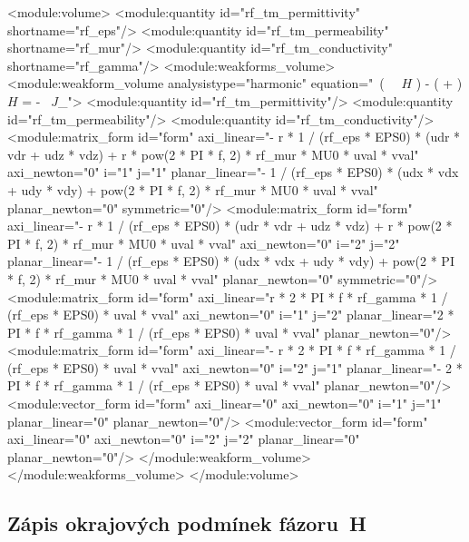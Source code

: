 \documentclass[12pt,a4paper,oneside]{article}
\numberwithin{equation}{section} %
\numberwithin{figure}{section} %
\numberwithin{table}{section} %
\newcommand{\mj}{\mathrm{j}} %
\newcommand{\vecfaz}[1]{\mbox{\underline{\boldmath$#1$}}} %
\newcommand{\curl}{\mathrm{curl}\ }
\begin{document}
\small\begin{spverbatim}
  <module:volume>
    <module:quantity id="rf_tm_permittivity" shortname="rf_eps"/>
    <module:quantity id="rf_tm_permeability" shortname="rf_mur"/>
    <module:quantity id="rf_tm_conductivity" shortname="rf_gamma"/>
    <module:weakforms_volume>
      <module:weakform_volume analysistype="harmonic" equation="\curl \left( \, \curl \vecfaz{H} \right) - \mj \omega \left( \gamma + \mj \omega \varepsilon \right) \vecfaz{H} = - \curl \vecfaz{J}_{}">
        <module:quantity id="rf_tm_permittivity"/>
        <module:quantity id="rf_tm_permeability"/>
        <module:quantity id="rf_tm_conductivity"/>
        <module:matrix_form id="form" axi_linear="- r * 1 / (rf_eps * EPS0) * (udr * vdr + udz * vdz) + r * pow(2 * PI * f, 2) * rf_mur * MU0 * uval * vval" axi_newton="0" i="1" j="1" planar_linear="- 1 / (rf_eps * EPS0) * (udx * vdx + udy * vdy) + pow(2 * PI * f, 2) * rf_mur * MU0 * uval * vval" planar_newton="0" symmetric="0"/>
        <module:matrix_form id="form" axi_linear="- r * 1 / (rf_eps * EPS0) * (udr * vdr + udz * vdz) + r * pow(2 * PI * f, 2) * rf_mur * MU0 * uval * vval" axi_newton="0" i="2" j="2" planar_linear="- 1 / (rf_eps * EPS0) * (udx * vdx + udy * vdy) + pow(2 * PI * f, 2) * rf_mur * MU0 * uval * vval" planar_newton="0" symmetric="0"/>
        <module:matrix_form id="form" axi_linear="r * 2 * PI * f * rf_gamma * 1 / (rf_eps * EPS0) * uval * vval" axi_newton="0" i="1" j="2" planar_linear="2 * PI * f * rf_gamma * 1 / (rf_eps * EPS0) * uval * vval" planar_newton="0"/>
        <module:matrix_form id="form" axi_linear="- r * 2 * PI * f * rf_gamma * 1 / (rf_eps * EPS0) * uval * vval" axi_newton="0" i="2" j="1" planar_linear="- 2 * PI * f * rf_gamma * 1 / (rf_eps * EPS0) * uval * vval" planar_newton="0"/>
        <module:vector_form id="form" axi_linear="0" axi_newton="0" i="1" j="1" planar_linear="0" planar_newton="0"/>
        <module:vector_form id="form" axi_linear="0" axi_newton="0" i="2" j="2" planar_linear="0" planar_newton="0"/>
     </module:weakform_volume>
    </module:weakforms_volume>
  </module:volume>
\end{spverbatim}


\subsection*{Zápis okrajových podmínek fázoru~H}
\label{XMLHs}
\end{document}
